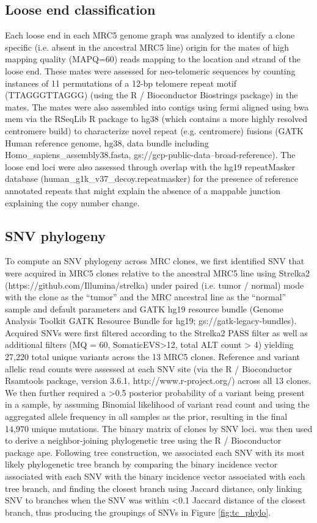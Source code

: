 \documentclass[phd,tocprelim]{cornell}
\begin{document}
\subsection*{Loose end classification} \label{app:tc_loose_end}
Each loose end in each MRC5 genome graph was analyzed to identify a clone specific (i.e. absent in the ancestral MRC5 line) origin for the mates of high mapping quality (MAPQ=60) reads mapping to the location and strand of the loose end. These mates were assessed for neo-telomeric sequences by counting instances of 11 permutations of a 12-bp telomere repeat motif (TTAGGGTTAGGG) (using the R / Bioconductor Biostrings package) in the mates. The mates were also assembled into contigs using fermi \cite{Li2012-ac} aligned using bwa mem \cite{Li2014-mj} via the RSeqLib R package \cite{Wala2017-ud} to hg38 (which contains a more  highly resolved centromere build) to characterize novel repeat (e.g. centromere) fusions (GATK Human reference genome, hg38, data bundle including Homo\_sapiens\_assembly38.fasta, gs://gcp-public-data--broad-reference). The loose end loci were also assessed through overlap with the hg19 repeatMasker database (human\_g1k\_v37\_decoy.repeatmasker) for the presence of reference annotated repeats that might explain the absence of a mappable junction explaining the copy number change.  

\subsection*{SNV phylogeny}
To compute an SNV phylogeny across MRC clones, we first identified SNV that were acquired in MRC5 clones relative to the ancestral MRC5 line using Strelka2 \cite{kim2018} (https://github.com/Illumina/strelka) under paired (i.e. tumor / normal) mode with the clone as the “tumor” and the MRC ancestral line as the “normal” sample and default parameters and GATK hg19 resource bundle (Genome Analysis Toolkit GATK Resource Bundle for hg19; gs://gatk-legacy-bundles). Acquired SNVs were first filtered according to the Strelka2 PASS filter as well as additional filters (MQ = 60, SomaticEVS>12, total ALT count > 4) yielding 27,220 total unique variants across the 13 MRC5 clones. Reference and variant allelic read counts were assessed at each SNV site (via the R / Bioconductor Rsamtools package, version 3.6.1, http://www.r-project.org/) across all 13 clones. We then further required a >0.5 posterior probability of a variant being present in a sample, by assuming Binomial likelihood of variant read count and using the aggregated allele frequency in all samples as the prior, resulting in the final 14,970 unique mutations. The binary matrix of clones by SNV loci. was then used to derive a neighbor-joining phylogenetic tree using the R / Bioconductor package ape. Following tree construction, we associated each SNV with its most likely phylogenetic tree branch by comparing the binary incidence vector associated with each SNV with the binary incidence vector associated with each tree branch, and finding the closest branch using Jaccard distance, only linking SNV to branches when the SNV was within <0.1 Jaccard distance of the closest branch, thus producing the groupings of SNVs in Figure \ref*{fig:tc_phylo}.   
\end{document}
